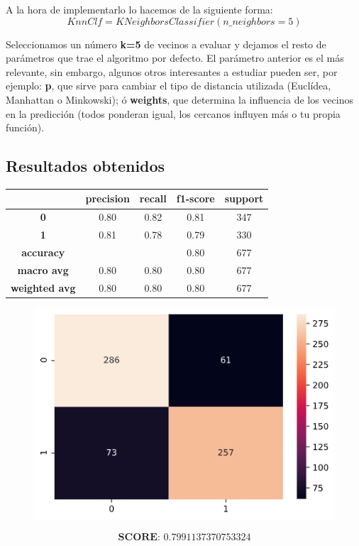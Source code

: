 \documentclass[11pt,a4paper]{article}
\begin{document}
\newpage
A la hora de implementarlo lo hacemos de la siguiente forma:
$$KnnClf = KNeighborsClassifier(n\_neighbors=5)$$

Seleccionamos un número \textbf{k=5} de vecinos a evaluar y dejamos el resto de parámetros que trae el algoritmo por defecto. El
parámetro anterior es el más relevante, sin embargo, algunos otros interesantes a estudiar pueden ser, por ejemplo: \textbf{p},
que sirve para cambiar el tipo de distancia utilizada (Euclídea, Manhattan o Minkowski); ó \textbf{weights}, que determina la
influencia de los vecinos en la predicción (todos ponderan igual, los cercanos influyen más o tu propia función).

\subsection*{Resultados obtenidos}
\begin{table}[H]
    \centering
    \begin{tabular}{c|cccc}
        \textbf{} & \textbf{precision} & \textbf{recall} & \textbf{f1-score} & \textbf{support} \\ \hline
        \textbf{0} & 0.80 & 0.82 & 0.81 & 347 \\
        \textbf{1} & 0.81 & 0.78 & 0.79 & 330 \\ \hline
        \textbf{accuracy} &  &  & 0.80 & 677 \\
        \textbf{macro avg} & 0.80 & 0.80 & 0.80 & 677 \\
        \textbf{weighted avg} & 0.80 & 0.80 & 0.80 & 677
    \end{tabular}
\end{table}

\begin{figure}[H]
    \centering
    \includegraphics[scale=0.5]{img/matrix-knn.png}    
\end{figure}
$$\textbf{SCORE:  } 0.7991137370753324$$
\end{document}
